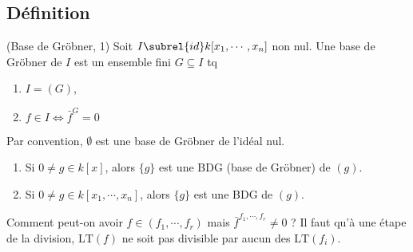         \subsection{Définition}
            \begin{defi} (Base de Gröbner, 1)
                \label{grob_1}
                Soit $I \subrel{id} k[x_1, \cdots, x_n]$ non nul. Une base de Gröbner de $I$ est un ensemble fini $G \subseteq I$ tq
                \begin{enumerate}
                    \item $I = (G)$,
                    \item $f \in I \iff \bar f^G = 0$
                \end{enumerate}
            \end{defi}
            Par convention, $\emptyset$ est une base de Gröbner de l'idéal nul.
            \begin{expl}
                \begin{enumerate}
                    \item Si $0 \neq g \in k[x]$, alors $\{g\}$ est une BDG (base de Gröbner) de $(g)$.
                    \item Si $0 \neq g \in k[x_1, \cdots, x_n]$, alors $\{g\}$ est une BDG de $(g)$.
                \end{enumerate}
            \end{expl}
            Comment peut-on avoir $f \in (f_1, \cdots, f_r)$ mais $\bar f^{f_1, \cdots, f_r} \neq 0$ ? Il faut qu'à une étape de la division, $\mathrm{LT}(f)$ ne soit pas divisible par aucun des $\mathrm{LT}(f_i)$. 
        
